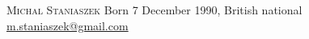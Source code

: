 \documentclass[a4paper,10pt]{article}
\begin{document}
\thispagestyle{empty}
\pagestyle{empty}
  {\Huge \textsc{Michal Staniaszek}} \hspace*{0.3cm} Born 7 December 1990, British national \hspace*{0.3cm} \href{mailto:contact@michalstaniaszek.com}{m.staniaszek@gmail.com}  


\vspace*{1pt}
\end{document}
